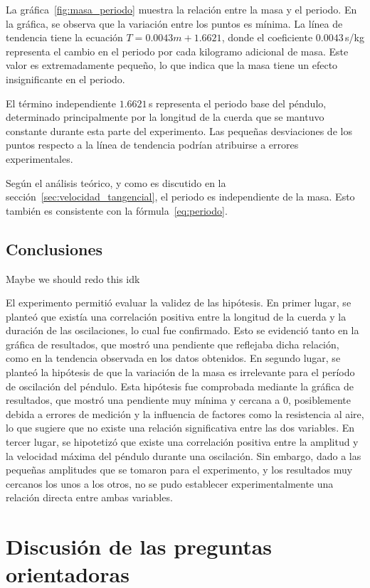\documentclass[letterpaper]{report}
\numberwithin{table}{section}
\begin{document}
La gráfica~\ref{fig:masa_periodo} muestra la relación entre la masa y
el periodo. En la gráfica, se observa que la variación entre los
puntos es mínima. La línea de tendencia tiene la ecuación $T =
0.0043m + 1.6621$,
donde el coeficiente $0.0043$\,s/kg representa el cambio en el periodo por cada
kilogramo adicional de masa. Este valor es extremadamente pequeño, lo que indica
que la masa tiene un efecto insignificante en el periodo.

El término independiente $1.6621$\,s representa el periodo base del péndulo,
determinado principalmente por la longitud de la cuerda que se mantuvo constante
durante esta parte del experimento. Las pequeñas desviaciones de los puntos
respecto a la línea de tendencia podrían atribuirse a errores experimentales.

Según el análisis teórico, y como es discutido en
la sección~\ref{sec:velocidad_tangencial}, el periodo es independiente de la
masa. Esto también es consistente con la fórmula~\eqref{eq:periodo}.

\section{Conclusiones}

{\color{red} Maybe we should redo this idk}

El experimento permitió evaluar la validez de las hipótesis.
En primer lugar, se planteó que existía una correlación positiva
entre la longitud de la cuerda y la duración de las oscilaciones, lo
cual fue confirmado. Esto se evidenció tanto en la gráfica de
resultados, que mostró una pendiente que reflejaba dicha relación,
como en la tendencia observada en los datos obtenidos. En segundo
lugar, se planteó la hipótesis de que la variación de la masa es
irrelevante para el período de oscilación del péndulo. Esta hipótesis
fue comprobada mediante la gráfica de resultados, que mostró una
pendiente muy mínima y cercana a 0, posiblemente debida a errores
de medición y la influencia de factores como la resistencia al aire,
lo que sugiere que no existe una relación significativa entre las dos
variables. En tercer lugar, se hipotetizó que existe una correlación
positiva entre la amplitud y la velocidad máxima del péndulo durante
una oscilación. Sin embargo, dado a las pequeñas amplitudes que se
tomaron para el experimento, y los resultados muy cercanos los unos a
los otros, no se pudo establecer experimentalmente una relación
directa entre ambas variables.

\chapter{Discusión de las preguntas orientadoras}
\end{document}
